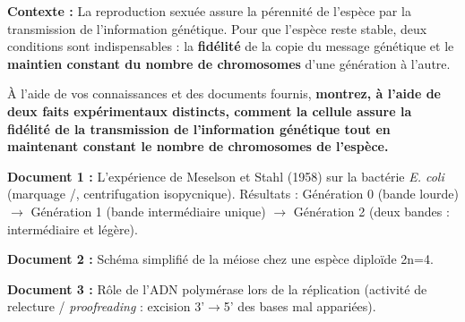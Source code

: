 \documentclass[11pt]{article}
\begin{document}
\begin{exercice}
\textbf{Contexte :} La reproduction sexuée assure la pérennité de l'espèce par la transmission de l'information génétique. Pour que l'espèce reste stable, deux conditions sont indispensables : la \textbf{fidélité} de la copie du message génétique et le \textbf{maintien constant du nombre de chromosomes} d'une génération à l'autre.

À l'aide de vos connaissances et des documents fournis, \textbf{montrez, à l'aide de deux faits expérimentaux distincts, comment la cellule assure la fidélité de la transmission de l'information génétique tout en maintenant constant le nombre de chromosomes de l'espèce.}

\textbf{Document 1 :} L'expérience de Meselson et Stahl (1958) sur la bactérie \emph{E. coli} (marquage /, centrifugation isopycnique). Résultats : Génération 0 (bande lourde) $\to$ Génération 1 (bande intermédiaire unique) $\to$ Génération 2 (deux bandes : intermédiaire et légère).

\textbf{Document 2 :} Schéma simplifié de la méiose chez une espèce diploïde 2n=4.
\begin{center}
\end{center}

\textbf{Document 3 :} Rôle de l'ADN polymérase lors de la réplication (activité de relecture / \emph{proofreading} : excision 3'$\to$5' des bases mal appariées).


\end{exercice}
\end{document}
